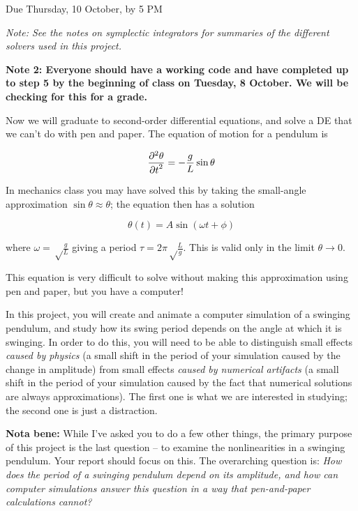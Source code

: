 \documentclass[12pt]{article}
\def\PARTWO#1#2{ {{\partial^2 #1}\over{\partial #2}^2} }
\begin{document}
\Large
\centerline{}
\centerline{Due Thursday, 10 October, by 5 PM}
\normalsize


\begin{center}
\it Note: See the notes on symplectic integrators for summaries of the different solvers used in this project.

\bigskip

\bf Note 2: Everyone should have a working code and have completed up to step 5 by the beginning of class on Tuesday, 8 October. We will be checking for this for a grade.
\end{center}
\rm
Now we will graduate to second-order differential equations, and solve a DE that we can't do with pen and paper. The equation of motion for a pendulum is

\begin{equation}
\PARTWO{\theta}{t}=-\frac{g}{L} \sin \theta
\end{equation}

In mechanics class you may have solved this by taking the small-angle approximation $\sin \theta \approx \theta$; the equation then has a solution

\begin{equation}
\theta(t) = A \sin (\omega t + \phi)
\end{equation}

where $\omega=\sqrt\frac{g}{L}$ giving a period $\tau=2\pi\sqrt\frac{L}{g}$. This is valid only in the limit $\theta \rightarrow 0$.

This equation is very difficult to solve without making this approximation using pen and paper, but you have a computer! 

In this project, you will create and animate a computer simulation of a swinging pendulum, and study how its swing period depends on the angle at which it is swinging.
In order to do this, you will need to be able to distinguish small effects {\it caused by physics} (a small shift in the period of your simulation caused by the change in
amplitude) from small effects {\it caused by numerical artifacts} (a small shift in the period of your simulation caused by the fact that numerical solutions are always
approximations). The first one is what we are interested in studying; the second one is just a distraction.

{\bf Nota bene:} While I've asked you to do a few other things, the primary purpose of this project is the last question -- to examine the nonlinearities in a swinging pendulum. Your report should focus on this. 
The overarching question is: {\it How does the period of a swinging pendulum depend on its amplitude, and how can computer simulations answer this question in a way that pen-and-paper calculations cannot?} 
\end{document}
